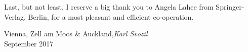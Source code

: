 Last, but not least, I reserve a big thank you to Angela Lahee  from Springer-Verlag, Berlin, for a most pleasant and
efficient co-operation.


\vspace{1cm}
\begin{flushright}\noindent
Vienna, Zell am Moos \& Auckland,\hfill {\it Karl Svozil}\\
September 2017\hfill {\it }\\
\end{flushright}




